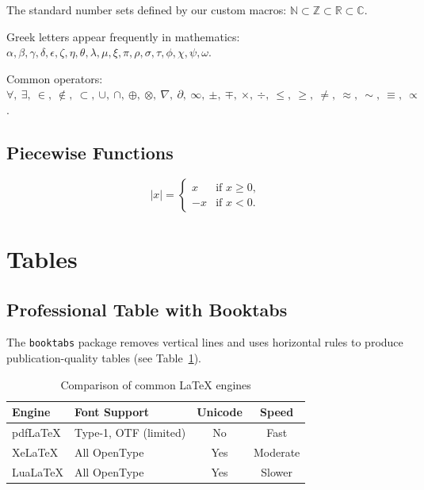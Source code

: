\documentclass[12pt, a4paper]{article}
\theoremstyle{definition}
\theoremstyle{plain}
\theoremstyle{remark}
\newcommand{\R}{\mathbb{R}}             %
\newcommand{\N}{\mathbb{N}}             %
\newcommand{\Z}{\mathbb{Z}}             %
\newcommand{\C}{\mathbb{C}}             %
\begin{document}
The standard number sets defined by our custom macros:
$\N \subset \Z \subset \R \subset \C$.

Greek letters appear frequently in mathematics:
$\alpha, \beta, \gamma, \delta, \epsilon, \zeta, \eta, \theta,
 \lambda, \mu, \xi, \pi, \rho, \sigma, \tau, \phi, \chi, \psi, \omega$.

Common operators: $\forall,\ \exists,\ \in,\ \notin,\ \subset,\ \cup,\
\cap,\ \oplus,\ \otimes,\ \nabla,\ \partial,\ \infty,\ \pm,\ \mp,\ \times,\
\div,\ \leq,\ \geq,\ \neq,\ \approx,\ \sim,\ \equiv,\ \propto$.

\subsection{Piecewise Functions}

\[
  |x| = \begin{cases}
           x  & \text{if } x \geq 0, \\
          -x  & \text{if } x < 0.
         \end{cases}
\]


\section{Tables}
\label{sec:tables}

\subsection{Professional Table with Booktabs}

The \texttt{booktabs} package removes vertical lines and uses horizontal
rules to produce publication-quality tables (see Table~\ref{tab:basic}).

\begin{table}[H]
  \centering
  \caption{Comparison of common \LaTeX{} engines}
  \label{tab:basic}
  \begin{tabular}{llcc}
    \toprule
    \textbf{Engine}   & \textbf{Font Support} & \textbf{Unicode} & \textbf{Speed} \\
    \midrule
    pdfLaTeX          & Type-1, OTF (limited) & No               & Fast           \\
    XeLaTeX           & All OpenType          & Yes              & Moderate       \\
    LuaLaTeX          & All OpenType          & Yes              & Slower         \\
    \bottomrule
  \end{tabular}
\end{table}
\end{document}
